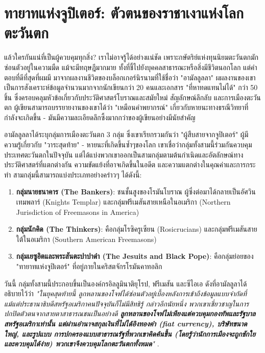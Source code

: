 \documentclass[10pt,twocolumn,letterpaper]{article}
\begin{document}
\section{ทายาทแห่งจูปิเตอร์: ตัวตนของราชาเงาแห่งโลกตะวันตก}

แล้วใครกันแน่ที่เป็นผู้ควบคุมทุกสิ่ง? เราไม่อาจรู้ได้อย่างแน่ชัด เพราะกษัตริย์แห่งทุนนิยมตะวันตกมักซ่อนตัวอยู่ในความมืด แม้จะมีทฤษฎีมากมาย ทั้งที่ชี้ไปยังบุคคลสาธารณะหรือสิ่งมีชีวิตนอกโลก แต่คำตอบที่ดีที่สุดที่ผมมี มาจากผลงานชีวิตของบล็อกเกอร์นิรนามที่ใช้ชื่อว่า "อามัลลูลลา" ผผลงานของเขาเป็นการสังเคราะห์ข้อมูลจำนวนมากจากนักเขียนกว่า 20 คนและเอกสาร "ที่หาทดแทนไม่ได้" กว่า 50 ชิ้น ซึ่งครอบคลุมหัวข้อเกี่ยวกับประวัติศาสตร์โบราณและสมัยใหม่ สัญลักษณ์ลึกลับ และการเมืองตะวันตก \cite{33,34} ผู้เขียนสามารถบรรยายงานของเขาได้ว่า "เหมือนคำพยากรณ์" เกี่ยวกับหายนะทางธรณีวิทยาที่กำลังจะเกิดขึ้น - มันมีความละเอียดลึกซึ้งมากกว่าของผู้เขียนอย่างมีนัยสำคัญ

อามัลลูลลาได้ระบุกลุ่มการเมืองตะวันตก 3 กลุ่ม ซึ่งเขาเรียกรวมกันว่า "ผู้สืบสายจากจูปิเตอร์" ผู้มีความรู้เกี่ยวกับ "วาระสุดท้าย" - หายนะที่เกิดขึ้นซ้ำๆของโลก เขาเชื่อว่ากลุ่มทั้งสามนี้ร่วมกันควบคุมประเทศตะวันตกในปัจจุบัน แต่ได้แบ่งพวกเขาออกเป็นสามกลุ่มตามต้นกำเนิดและอัตลักษณ์ทางประวัติศาสตร์ที่แตกต่างกัน ความขัดแย้งที่อาจเกิดขึ้นในอดีต และความแตกต่างในคุณค่าและการกระทำ
สามกลุ่มนี้สามารถแบ่งประเภทอย่างคร่าวๆ ได้ดังนี้:

\begin{flushleft}
\begin{enumerate}
    \item \textbf{กลุ่มนายธนาคาร (The Bankers)}: ชนชั้นสูงของโรมันโบราณ ผู้ซึ่งต่อมาได้กลายเป็นอัศวินเทมพลาร์ (Knights Templar) และกลุ่มฟรีเมสันสายเหนือในอเมริกา (Northern Jurisdiction of Freemasons in America)
    \item \textbf{กลุ่มนักคิด (The Thinkers)}:  คือกลุ่มโรซิครูเซียน (Rosicrucians) และกลุ่มฟรีเมสันสายใต้ในอเมริกา (Southern American Freemasons)
    \item \textbf{กลุ่มเยซูอิตและพระสันตะปาปาดำ (The Jesuits and Black Pope)}:  คือกลุ่มย่อยของ "ทายาทแห่งจูปิเตอร์" ที่อยู่ภายในคริสตจักรโรมันคาทอลิก
\end{enumerate}
\end{flushleft}
วันนี้ กลุ่มทั้งสามนี้ประกอบขึ้นเป็นองค์กรอิลลูมินาติยุโรป, ฟรีเมสัน และซีไอเอ ดังที่อามัลลูลาได้อธิบายไว้ว่า \textit{"ในยุคสุดท้ายนี้ ลูกหลานของโจฟได้ซ่อนตัวอยู่เบื้องหลังการเข้าถึงข้อมูลแบบจำกัดที่แม้แต่ประธานาธิบดีสหรัฐอเมริกาคนปัจจุบันก็ไม่มีสิทธิรู้ กล่าวอีกนัยหนึ่ง พวกเขาเชี่ยวชาญในการปกปิดตัวตนจากสายตาสาธารณชนเป็นอย่างดี \textbf{ลูกหลานของโจฟไม่เพียงแต่ควบคุมกองทัพและรัฐบาลสหรัฐอเมริกาเท่านั้น แต่ผ่านอำนาจสกุลเงินที่ไม่ได้อิงทองคำ (fiat currency), บริษัทขนาดใหญ่, และรูปแบบ การปกครองแบบสาธารณรัฐที่พวกเขาคิดค้นขึ้น (โดยรู้ว่านักการเมืองจะถูกชักใยและควบคุมได้ง่าย) พวกเขาจึงควบคุมโลกตะวันตกทั้งหมด}"} \cite{33,34}.
\end{document}
